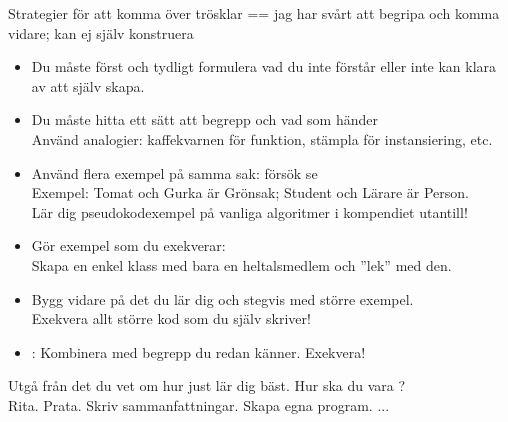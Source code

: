 \begin{Slide}{Strategier för att komma över trösklar}\SlideFontSmall
{} == jag har svårt att begripa och komma vidare; kan ej själv konstruera

\begin{itemize}\SlideFontTiny
\item Du måste först  och tydligt formulera vad du inte förstår eller inte kan klara av att själv skapa.

\item Du måste hitta ett sätt att  begrepp och  vad som händer \\
Använd analogier: kaffekvarnen för funktion, stämpla för instansiering, etc.

\item Använd flera exempel på samma sak: försök se  \\
Exempel: Tomat och Gurka är Grönsak; Student och Lärare är Person. \\ Lär dig pseudokodexempel på vanliga algoritmer i kompendiet utantill!

\item Gör  exempel som du exekverar: \\ Skapa en enkel klass med bara en heltalsmedlem och ''lek'' med den.

\item Bygg vidare på det du lär dig och  stegvis med större exempel.\\ Exekvera allt större kod som du själv skriver!

\item {}: Kombinera med begrepp du redan känner. Exekvera!

\end{itemize}
Utgå från det du vet om hur just  lär dig bäst. Hur ska du vara ? \\ Rita. Prata. Skriv sammanfattningar. Skapa egna program. ...
\end{Slide}

\fi












